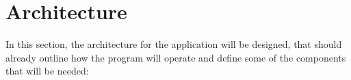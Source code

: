 \section{Architecture}
\label{sec:architecture}

In this section, the architecture for the application will be designed, that should already outline how the program will operate and define some of the components that will be needed:

